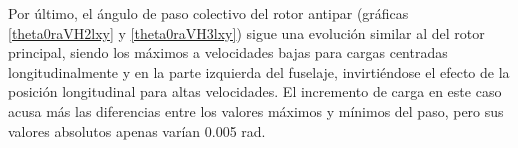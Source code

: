 Por último, el ángulo de paso colectivo del rotor antipar (gráficas \ref{theta0raVH2lxy} y \ref{theta0raVH3lxy}) sigue una evolución similar al del rotor principal, siendo los máximos a velocidades bajas para cargas centradas longitudinalmente y en la parte izquierda del fuselaje, invirtiéndose el efecto de la posición longitudinal para altas velocidades. El incremento de carga en este caso acusa más las diferencias entre los valores máximos y mínimos del paso, pero sus valores absolutos apenas varían 0.005 rad.
